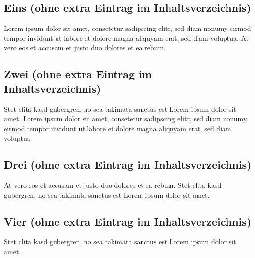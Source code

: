 \chapter{\appendixname}

\section*{Eins (ohne extra Eintrag im Inhaltsverzeichnis)}
Lorem ipsum dolor sit amet, consetetur sadipscing elitr, sed diam nonumy eirmod tempor invidunt ut labore et dolore magna aliquyam erat, sed diam voluptua. At vero eos et accusam et justo duo dolores et ea rebum.

\section*{Zwei (ohne extra Eintrag im Inhaltsverzeichnis)}
Stet clita kasd gubergren, no sea takimata sanctus est Lorem ipsum dolor sit amet. Lorem ipsum dolor sit amet, consetetur sadipscing elitr, sed diam nonumy eirmod tempor invidunt ut labore et dolore magna aliquyam erat, sed diam voluptua.

\section*{Drei (ohne extra Eintrag im Inhaltsverzeichnis)}
At vero eos et accusam et justo duo dolores et ea rebum. Stet clita kasd gubergren, no sea takimata sanctus est Lorem ipsum dolor sit amet.

\section*{Vier (ohne extra Eintrag im Inhaltsverzeichnis)}
Stet clita kasd gubergren, no sea takimata sanctus est Lorem ipsum dolor sit amet.